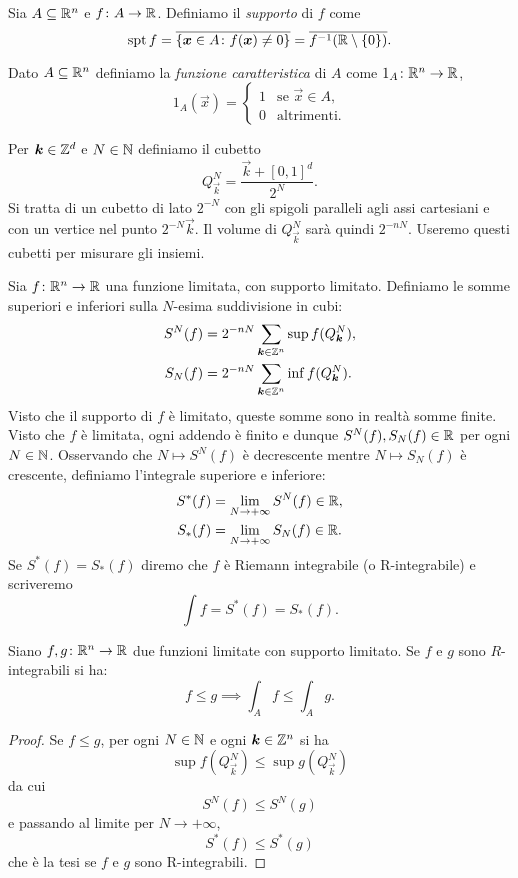 Sia $A\subseteq {\mathbb R}^n$ e $f\colon A \to {\mathbb R}$. 
Definiamo il \emph{supporto} di $f$ come 
\[
 \operatorname{spt} f 
    = \overline{{\left\{ \boldsymbol x \in A \colon f(\boldsymbol x) \neq 0 \right\}}}
    = \overline{f^{-1}({\mathbb R}\setminus{\left\{ 0 \right\}})}.
\]

Dato $A\subseteq {\mathbb R}^n$ definiamo la \emph{funzione caratteristica}
di $A$ come $1_A\colon {\mathbb R}^n \to {\mathbb R}$,
\[
  1_A(\vec x) = \begin{cases}
    1 & \text{se $\vec x \in A$,}\\
    0 & \text{altrimenti.}
  \end{cases}
\]

Per $\boldsymbol k \in {\mathbb Z}^d$ e $N\in {\mathbb N}$ definiamo 
il cubetto 
\[
  Q^N_{\vec k} = \frac{\vec k + [0,1]^d}{2^N}.
\]
Si tratta di un cubetto di lato $2^{-N}$ con gli spigoli paralleli 
agli assi cartesiani e con un vertice nel punto $2^{-N} \vec k$.
Il volume di $Q^N_{\vec k}$ sarà quindi $2^{-nN}$.
Useremo questi cubetti per misurare gli insiemi.

\begin{definition}
  \label{def:integrale_riemann}
Sia $f\colon {\mathbb R}^n \to {\mathbb R}$ una funzione limitata, 
con supporto limitato.
Definiamo le somme superiori e inferiori sulla $N$-esima suddivisione in cubi:
\begin{align*}
    S^N(f) &= 2^{-nN}\sum_{\boldsymbol k\in {\mathbb Z}^n} \sup f(Q^N_{\boldsymbol k}), \\
    S_N(f) &= 2^{-nN}\sum_{\boldsymbol k\in {\mathbb Z}^n} \inf f(Q^N_{\boldsymbol k}).
\end{align*}
Visto che il supporto di $f$ è limitato, queste somme sono in realtà 
somme finite. Visto che $f$ è limitata, ogni addendo è finito e dunque 
$S^N(f), S_N(f) \in {\mathbb R}$ per ogni $N\in {\mathbb N}$.
Osservando che $N\mapsto S^N(f)$ è decrescente 
mentre $N\mapsto S_N(f)$ è crescente, definiamo
l'integrale superiore e inferiore:
\begin{align*}
    S^*(f) &= \lim_{N\to +\infty} S^N(f) \in {\mathbb R}, \\
    S_*(f) &= \lim_{N\to +\infty} S_N(f) \in {\mathbb R}.
\end{align*}
Se $S^*(f)=S_*(f)$ diremo che $f$ è Riemann integrabile (o R-integrabile)
e scriveremo
\[
  \int f = S^*(f) = S_*(f).
\]
\end{definition}

\begin{theorem}
Siano $f,g\colon {\mathbb R}^n\to{\mathbb R}$ due funzioni limitate con supporto limitato.
Se $f$ e $g$ sono $R$-integrabili si ha:
\[
  f \le g \implies \int_A f \le \int_A g.
\]
\end{theorem}
%
\begin{proof}
Se $f\le g$, per ogni $N\in {\mathbb N}$ e ogni $\boldsymbol k \in {\mathbb Z}^n$ si ha 
\[
    \sup f(Q^N_{\vec k}) \le \sup g(Q^N_{\vec k}) 
\]
da cui 
\[
    S^N(f) \le S^N(g)
\]
e passando al limite per $N\to +\infty$,
\[
  S^*(f) \le S^*(g)
\]
che è la tesi se $f$ e $g$ sono R-integrabili.
\end{proof}


